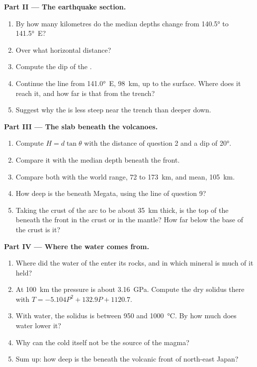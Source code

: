 \begin{problem}
\medskip
\noindent\textbf{Part II --- The earthquake section.}
\begin{enumerate}[resume]
  \item By how many kilometres do the median depths change from
        \ang{140.5} to \ang{141.5}~E?
  \item Over what horizontal distance?
  \item Compute the dip of the .
  \item Continue the line from \ang{141.0}~E, \qty{98}{km}, up to the
        surface. Where does it reach it, and how far is that from the trench?
  \item Suggest why the  is less steep near the trench than deeper down.
\end{enumerate}

\medskip
\noindent\textbf{Part III --- The slab beneath the volcanoes.}
\begin{enumerate}[resume]
  \item Compute $H = d\tan\theta$ with the distance of question 2 and a dip
        of \ang{20}.
  \item Compare it with the median depth beneath the front.
  \item Compare both with the world range, 72 to \qty{173}{km}, and mean,
        \qty{105}{km}.
  \item How deep is the  beneath Megata, using the line of question 9?
  \item Taking the crust of the arc to be about \qty{35}{km} thick, is the
        top of the  beneath the front in the crust or in the mantle? How
        far below the base of the crust is it?
\end{enumerate}

\medskip
\noindent\textbf{Part IV --- Where the water comes from.}
\begin{enumerate}[resume]
  \item Where did the water of the  enter its rocks, and in which
        mineral is much of it held?
  \item At \qty{100}{km} the pressure is about \qty{3.16}{GPa}. Compute the
        dry solidus there with $T = -5.104P^2 + 132.9P + 1120.7$.
  \item With water, the solidus is between 950 and \qty{1000}{\celsius}.
        By how much does water lower it?
  \item Why can the cold  itself not be the source of the magma?
  \item Sum up: how deep is the  beneath the volcanic front of north-east
        Japan?
\end{enumerate}
\end{problem}
